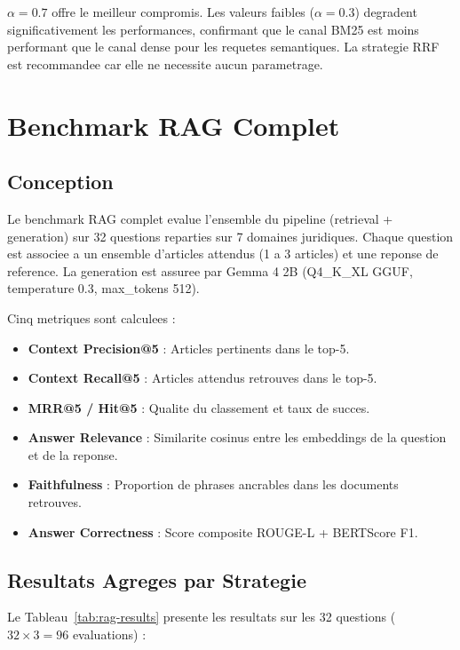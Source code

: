 $\alpha = 0.7$ offre le meilleur compromis. Les valeurs faibles ($\alpha = 0.3$) degradent significativement les performances, confirmant que le canal BM25 est moins performant que le canal dense pour les requetes semantiques. La strategie RRF est recommandee car elle ne necessite aucun parametrage.

\section{Benchmark RAG Complet}
\label{sec:bench-rag}

\subsection{Conception}

Le benchmark RAG complet evalue l'ensemble du pipeline (retrieval + generation) sur 32 questions reparties sur 7 domaines juridiques. Chaque question est associee a un ensemble d'articles attendus (1 a 3 articles) et une reponse de reference. La generation est assuree par Gemma 4 2B (Q4\_K\_XL GGUF, temperature 0.3, max\_tokens 512).

Cinq metriques sont calculees :
\begin{itemize}
    \item \textbf{Context Precision@5} : Articles pertinents dans le top-5.
    \item \textbf{Context Recall@5} : Articles attendus retrouves dans le top-5.
    \item \textbf{MRR@5 / Hit@5} : Qualite du classement et taux de succes.
    \item \textbf{Answer Relevance} : Similarite cosinus entre les embeddings de la question et de la reponse.
    \item \textbf{Faithfulness} : Proportion de phrases ancrables dans les documents retrouves.
    \item \textbf{Answer Correctness} : Score composite ROUGE-L + BERTScore F1.
\end{itemize}

\subsection{Resultats Agreges par Strategie}

Le Tableau~\ref{tab:rag-results} presente les resultats sur les 32 questions ($32 \times 3 = 96$ evaluations) :

